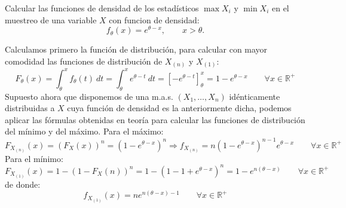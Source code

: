 \begin{ejercicio}
    Calcular las funciones de densidad de los estadísticos $\max X_i$ y $\min X_i$ en el muestreo de una variable $X$ con funcion de densidad:
    \begin{equation*}
        f_\theta(x) = e^{\theta-x}, \qquad x>\theta.
    \end{equation*}

    \noindent
    Calculamos primero la función de distribución, para calcular con mayor comodidad las funciones de distribución de $X_{(n)}$ y $X_{(1)}$:
    \begin{equation*}
        F_\theta(x) = \int_{\theta}^{x} f_\theta(t)~dt = \int_{\theta}^{x} e^{\theta-t}~dt  = \left[-e^{\theta-t}\right]_\theta^x = 1 - e^{\theta - x} \qquad \forall x\in \mathbb{R}^+
    \end{equation*}
    Supuesto ahora que disponemos de una m.a.s. $(X_1, \ldots, X_n)$ idénticamente distribuidas a $X$ cuya función de densidad es la anteriormente dicha, podemos aplicar las fórmulas obtenidas en teoría para calcular las funciones de distribución del mínimo y del máximo. Para el máximo:
    \begin{equation*}
        F_{X_{(n)}}(x) = {(F_X(x))}^{n} = {(1-e^{\theta-x})}^{n} \Longrightarrow f_{X_{(n)}} = n{(1-e^{\theta - x})}^{n-1}e^{\theta -x} \qquad \forall x\in \mathbb{R}^+
    \end{equation*}
    Para el mínimo:
    \begin{equation*}
        F_{X_{(1)}}(x) = 1 - {(1-F_X(n))}^{n} = 1-{(1-1+e^{\theta-x})}^{n} = 1-e^{n(\theta-x)} \qquad \forall x\in \mathbb{R}^+
    \end{equation*}
    de donde:
    \begin{equation*}
        f_{X_{(1)}}(x) = ne^{n(\theta-x)-1} \qquad \forall x\in \mathbb{R}^+
    \end{equation*}

\end{ejercicio}

